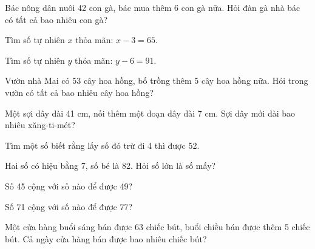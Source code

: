 \begin{ex}
Bác nông dân nuôi 42 con gà, bác mua thêm 6 con gà nữa. Hỏi đàn gà nhà bác có tất cả bao nhiêu con gà?
\end{ex}

\begin{ex}
Tìm số tự nhiên $x$ thỏa mãn: $x - 3 = 65$.
\end{ex}

\begin{ex}
Tìm số tự nhiên $y$ thỏa mãn: $y - 6 = 91$.
\end{ex}

\begin{ex}
Vườn nhà Mai có 53 cây hoa hồng, bố trồng thêm 5 cây hoa hồng nữa. Hỏi trong vườn có tất cả bao nhiêu cây hoa hồng?
\end{ex}

\begin{ex}
Một sợi dây dài 41 cm, nối thêm một đoạn dây dài 7 cm. Sợi dây mới dài bao nhiêu xăng-ti-mét?
\end{ex}

\begin{ex}
Tìm một số biết rằng lấy số đó trừ đi 4 thì được 52.
\end{ex}

\begin{ex}
Hai số có hiệu bằng 7, số bé là 82. Hỏi số lớn là số mấy?
\end{ex}

\begin{ex}
Số 45 cộng với số nào để được 49?
\end{ex}

\begin{ex}
Số 71 cộng với số nào để được 77?
\end{ex}

\begin{ex}
Một cửa hàng buổi sáng bán được 63 chiếc bút, buổi chiều bán được thêm 5 chiếc bút. Cả ngày cửa hàng bán được bao nhiêu chiếc bút?
\end{ex}

